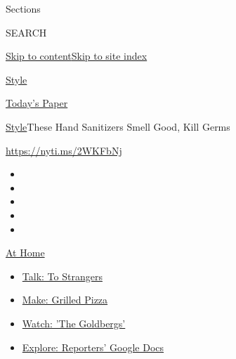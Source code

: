 Sections

SEARCH

\protect\hyperlink{site-content}{Skip to
content}\protect\hyperlink{site-index}{Skip to site index}

\href{https://www.nytimes3xbfgragh.onion/section/style}{Style}

\href{https://myaccount.nytimes3xbfgragh.onion/auth/login?response_type=cookie\&client_id=vi}{}

\href{https://www.nytimes3xbfgragh.onion/section/todayspaper}{Today's
Paper}

\href{/section/style}{Style}\textbar{}These Hand Sanitizers Smell Good,
Kill Germs

\href{https://nyti.ms/2WKFbNj}{https://nyti.ms/2WKFbNj}

\begin{itemize}
\item
\item
\item
\item
\item
\end{itemize}

\href{https://www.nytimes3xbfgragh.onion/spotlight/at-home?action=click\&pgtype=Article\&state=default\&region=TOP_BANNER\&context=at_home_menu}{At
Home}

\begin{itemize}
\tightlist
\item
  \href{https://www.nytimes3xbfgragh.onion/2020/08/03/well/family/the-benefits-of-talking-to-strangers.html?action=click\&pgtype=Article\&state=default\&region=TOP_BANNER\&context=at_home_menu}{Talk:
  To Strangers}
\item
  \href{https://www.nytimes3xbfgragh.onion/2020/08/01/at-home/coronavirus-make-pizza-on-a-grill.html?action=click\&pgtype=Article\&state=default\&region=TOP_BANNER\&context=at_home_menu}{Make:
  Grilled Pizza}
\item
  \href{https://www.nytimes3xbfgragh.onion/2020/07/31/arts/television/goldbergs-abc-stream.html?action=click\&pgtype=Article\&state=default\&region=TOP_BANNER\&context=at_home_menu}{Watch:
  'The Goldbergs'}
\item
  \href{https://www.nytimes3xbfgragh.onion/interactive/2020/at-home/even-more-reporters-editors-diaries-lists-recommendations.html?action=click\&pgtype=Article\&state=default\&region=TOP_BANNER\&context=at_home_menu}{Explore:
  Reporters' Google Docs}
\end{itemize}

